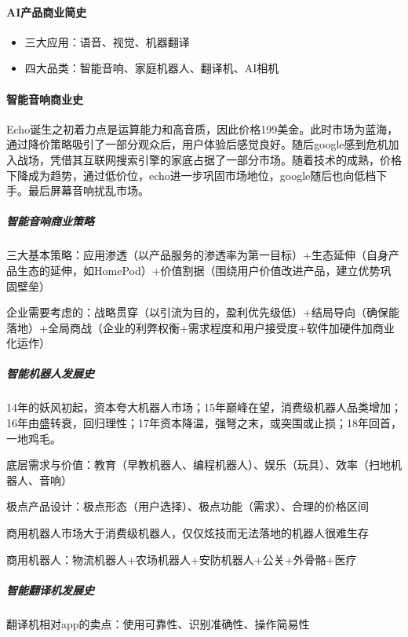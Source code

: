 \documentclass[letterpaper,10pt,english]{sphinxmanual}
\begin{document}
\paragraph{AI产品商业简史}
\label{\detokenize{chapter_project/AI_hardware:ai}}\begin{itemize}
\item {} 
三大应用：语音、视觉、机器翻译

\item {} 
四大品类：智能音响、家庭机器人、翻译机、AI相机

\end{itemize}


\paragraph{智能音响商业史}
\label{\detokenize{chapter_project/AI_hardware:id8}}
Echo诞生之初着力点是运算能力和高音质，因此价格199美金。此时市场为蓝海，通过降价策略吸引了一部分观众后，用户体验后感觉良好。随后google感到危机加入战场，凭借其互联网搜索引擎的家底占据了一部分市场。随着技术的成熟，价格下降成为趋势，通过低价位，echo进一步巩固市场地位，google随后也向低档下手。最后屏幕音响扰乱市场。


\subparagraph{智能音响商业策略}
\label{\detokenize{chapter_project/AI_hardware:id9}}
三大基本策略：应用渗透（以产品服务的渗透率为第一目标）+生态延伸（自身产品生态的延伸，如HomePod）+价值割据（围绕用户价值改进产品，建立优势巩固壁垒）

企业需要考虑的：战略贯穿（以引流为目的，盈利优先级低）+结局导向（确保能落地）+全局商战（企业的利弊权衡+需求程度和用户接受度+软件加硬件加商业化运作）


\subparagraph{智能机器人发展史}
\label{\detokenize{chapter_project/AI_hardware:id10}}
14年的妖风初起，资本夸大机器人市场；15年巅峰在望，消费级机器人品类增加；16年由盛转衰，回归理性；17年资本降温，强弩之末，或突围或止损；18年回首，一地鸡毛。

底层需求与价值：教育（早教机器人、编程机器人）、娱乐（玩具）、效率（扫地机器人、音响）

极点产品设计：极点形态（用户选择）、极点功能（需求）、合理的价格区间

商用机器人市场大于消费级机器人，仅仅炫技而无法落地的机器人很难生存

商用机器人：物流机器人+农场机器人+安防机器人+公关+外骨骼+医疗


\subparagraph{智能翻译机发展史}
\label{\detokenize{chapter_project/AI_hardware:id11}}
翻译机相对app的卖点：使用可靠性、识别准确性、操作简易性
\end{document}
